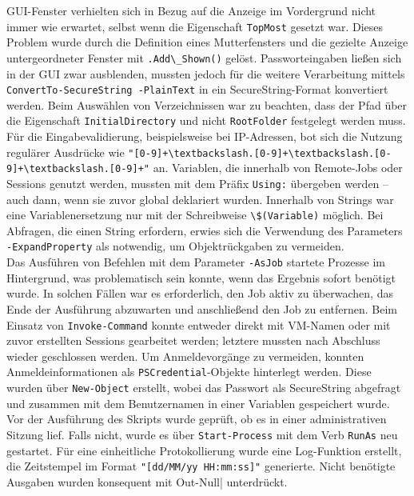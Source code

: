 \documentclass[a4paper,12pt]{article}
\begin{document}
GUI-Fenster verhielten sich in Bezug auf die Anzeige im Vordergrund nicht immer wie erwartet, selbst wenn die Eigenschaft \lstinline|TopMost| gesetzt war. Dieses Problem wurde durch die Definition eines Mutterfensters und die gezielte Anzeige untergeordneter Fenster mit \lstinline|.Add\_Shown()| gelöst. Passworteingaben ließen sich in der GUI zwar ausblenden, mussten jedoch für die weitere Verarbeitung mittels \lstinline|ConvertTo-SecureString -PlainText| in ein SecureString-Format konvertiert werden. Beim Auswählen von Verzeichnissen war zu beachten, dass der Pfad über die Eigenschaft \lstinline|InitialDirectory| und nicht \lstinline|RootFolder| festgelegt werden muss.\\  

Für die Eingabevalidierung, beispielsweise bei IP-Adressen, bot sich die Nutzung regulärer Ausdrücke wie \lstinline|"[0-9]+\textbackslash.[0-9]+\textbackslash.[0-9]+\textbackslash.[0-9]+"| an. Variablen, die innerhalb von Remote-Jobs oder Sessions genutzt werden, mussten mit dem Präfix \lstinline|Using:| übergeben werden -- auch dann, wenn sie zuvor global deklariert wurden. Innerhalb von Strings war eine Variablenersetzung nur mit der Schreibweise \lstinline|\$(Variable)| möglich. Bei Abfragen, die einen String erfordern, erwies sich die Verwendung des Parameters \lstinline|-ExpandProperty| als notwendig, um Objektrückgaben zu vermeiden.\\  

Das Ausführen von Befehlen mit dem Parameter \lstinline|-AsJob| startete Prozesse im Hintergrund, was problematisch sein konnte, wenn das Ergebnis sofort benötigt wurde. In solchen Fällen war es erforderlich, den Job aktiv zu überwachen, das Ende der Ausführung abzuwarten und anschließend den Job zu entfernen. Beim Einsatz von \lstinline|Invoke-Command| konnte entweder direkt mit VM-Namen oder mit zuvor erstellten Sessions gearbeitet werden; letztere mussten nach Abschluss wieder geschlossen werden. Um Anmeldevorgänge zu vermeiden, konnten Anmeldeinformationen als \lstinline|PSCredential|-Objekte hinterlegt werden. Diese wurden über \lstinline|New-Object| erstellt, wobei das Passwort als SecureString abgefragt und zusammen mit dem Benutzernamen in einer Variablen gespeichert wurde. \\ 

Vor der Ausführung des Skripts wurde geprüft, ob es in einer administrativen Sitzung lief. Falls nicht, wurde es über \lstinline|Start-Process| mit dem Verb \lstinline|RunAs| neu gestartet. Für eine einheitliche Protokollierung wurde eine Log-Funktion erstellt, die Zeitstempel im Format \lstinline|"[dd/MM/yy HH:mm:ss]"| generierte. Nicht benötigte Ausgaben wurden konsequent mit \lstinline|| Out-Null| unterdrückt. \\ 
\end{document}
